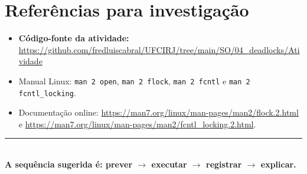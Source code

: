 \documentclass[11pt,a4paper]{article}
\begin{document}
\section{Referências para investigação}
\begin{itemize}[leftmargin=*]
\item \textbf{Código-fonte da atividade:} \url{https://github.com/fredluiscabral/UFCIRJ/tree/main/SO/04_deadlocks/Atividade}
\item Manual Linux: \texttt{man 2 open}, \texttt{man 2 flock}, \texttt{man 2 fcntl} e \texttt{man 2 fcntl\_locking}.
\item Documentação online: \url{https://man7.org/linux/man-pages/man2/flock.2.html} e \url{https://man7.org/linux/man-pages/man2/fcntl_locking.2.html}.
\end{itemize}
\vspace{5mm}
\begin{center}
\color{azul}\rule{.88\linewidth}{.4pt}\\[3pt]
\small\textbf{A sequência sugerida é: prever $\rightarrow$ executar $\rightarrow$ registrar $\rightarrow$ explicar.}
\end{center}
\end{document}
